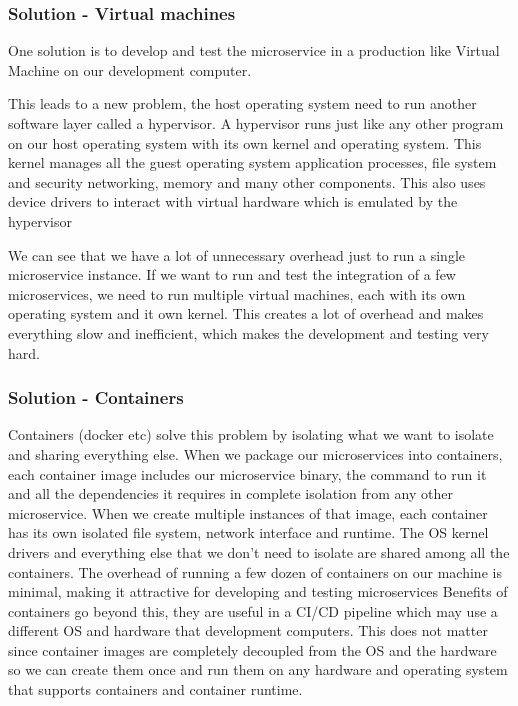 \subsubsection{Solution - Virtual machines}
One solution is to develop and test the microservice in a production like Virtual Machine on our development computer.

This leads to a new problem, the host operating system need to run another software layer called a hypervisor.
A hypervisor runs just like any other program on our host operating system with its own kernel and operating system.
This kernel manages all the guest operating system application processes, file system and security networking, memory and many other components.
This also uses device drivers to interact with virtual hardware which is emulated by the hypervisor

We can see that we have a lot of unnecessary overhead just to run a single microservice instance.
If we want to run and test the integration of a few microservices, we need to run multiple virtual machines, each with its own operating system and it own kernel.
This creates a lot of overhead and makes everything slow and inefficient, which makes the development and testing very hard.

\subsubsection{Solution - Containers}
Containers (docker etc) solve this problem by isolating what we want to isolate and sharing everything else.
When we package our microservices into containers, each container image includes our microservice binary, the command to run it and all the dependencies it requires in complete isolation from any other microservice.
When we create multiple instances of that image, each container has its own isolated file system, network interface and runtime.
The OS kernel drivers and everything else that we don't need to isolate are shared among all the containers.
The overhead of running a few dozen of containers on our machine is minimal, making it attractive for developing and testing microservices
Benefits of containers go beyond this, they are useful in a CI/CD pipeline which may use a different OS and hardware that development computers.
This does not matter since container images are completely decoupled from the OS and the hardware so we can create them once and run them on any hardware and operating system that supports containers and container runtime.

